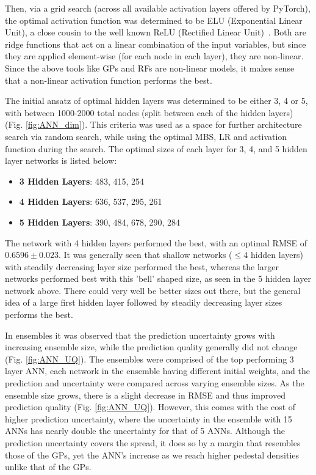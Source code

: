 \documentclass[a4paper, twoside, final, 12pt]{article}
\begin{document}
{Then, via a grid search (across all available activation layers offered by PyTorch), the optimal activation function was determined to be ELU (Exponential Linear Unit), a close cousin to the well known ReLU (Rectified Linear Unit)~\cite{pytorch_act}. Both are ridge functions that act on a linear combination of the input variables, but since they are applied element-wise (for each node in each layer), they are non-linear. Since the above tools like GPs and RFs are non-linear models, it makes sense that a non-linear activation function performs the best. 

The initial ansatz of optimal hidden layers was determined to be either 3, 4 or 5, with between 1000-2000 total nodes (split between each of the hidden layers) (Fig. \ref{fig:ANN_dim}). This criteria was used as a space for further architecture search via random search, while using the optimal MBS, LR and activation function during the search. 
The optimal sizes of each layer for 3, 4, and 5 hidden layer networks is listed below: 
\begin{itemize}
	\item \textbf{3 Hidden Layers}: 483, 415, 254
	\item \textbf{4 Hidden Layers}: 636, 537, 295, 261
	\item \textbf{5 Hidden Layers}: 390, 484, 678, 290, 284
\end{itemize} 
The network with 4 hidden layers performed the best, with an optimal RMSE of $0.6596 \pm 0.023$. 
It was generally seen that shallow networks ($\leq 4$ hidden layers) with steadily decreasing layer size performed the best, whereas the larger networks performed best with this 'bell' shaped size, as seen in the 5 hidden layer network above. 
There could very well be better sizes out there, but the general idea of a large first hidden layer followed by steadily decreasing layer sizes performs the best.

In ensembles it was observed that the prediction uncertainty grows with increasing ensemble size, while the prediction quality generally did not change (Fig. \ref{fig:ANN_UQ}). The ensembles were comprised of the top performing 3 layer ANN, each network in the ensemble having different initial weights, and the prediction and uncertainty were compared across varying ensemble sizes. As the ensemble size grows, there is a slight decrease in RMSE and thus improved prediction quality (Fig. \ref{fig:ANN_UQ}). However, this comes with the cost of higher prediction uncertainty, where the uncertainty in the ensemble with 15 ANNs has nearly double the uncertainty for that of 5 ANNs. Although the prediction uncertainty covers the spread, it does so by a margin that resembles those of the GPs, yet the ANN's increase as we reach higher pedestal densities unlike that of the GPs. 

}
\end{document}
